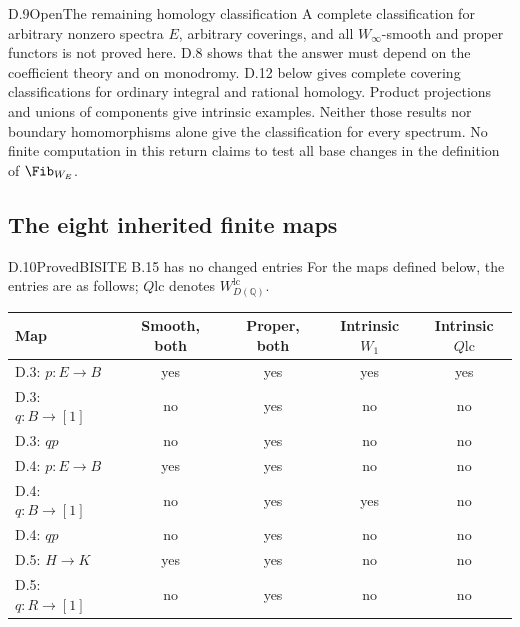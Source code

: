 \begin{claim}{D.9}{Open}{The remaining homology classification}
A complete classification for arbitrary nonzero spectra $E$, arbitrary coverings, and all $W_\infty$-smooth and proper functors is not proved here. D.8 shows that the answer must depend on the coefficient theory and on monodromy. D.12 below gives complete covering classifications for ordinary integral and rational homology. Product projections and unions of components give intrinsic examples. Neither those results nor boundary homomorphisms alone give the classification for every spectrum. No finite computation in this return claims to test all base changes in the definition of $\Fib_{W_E}$.
\end{claim}

\subsection{The eight inherited finite maps}
\begin{claim}{D.10}{Proved}{BISITE B.15 has no changed entries}
For the maps defined below, the entries are as follows; $Q\mathrm{lc}$ denotes $W_{D(\mathbb Q)}^{\mathrm{lc}}$.
\begin{center}\begin{tabular}{lcccc}
\toprule Map & Smooth, both & Proper, both & Intrinsic $W_1$ & Intrinsic $Q\mathrm{lc}$\\\midrule
D.3: $p:E\to B$ & yes&yes&yes&yes\\
D.3: $q:B\to[1]$ & no&yes&no&no\\
D.3: $qp$ & no&yes&no&no\\
D.4: $p:E\to B$ & yes&yes&no&no\\
D.4: $q:B\to[1]$ & no&yes&yes&no\\
D.4: $qp$ & no&yes&no&no\\
D.5: $H\to K$ & yes&yes&no&no\\
D.5: $q:R\to[1]$ & no&yes&no&no\\\bottomrule
\end{tabular}\end{center}
\end{claim}
